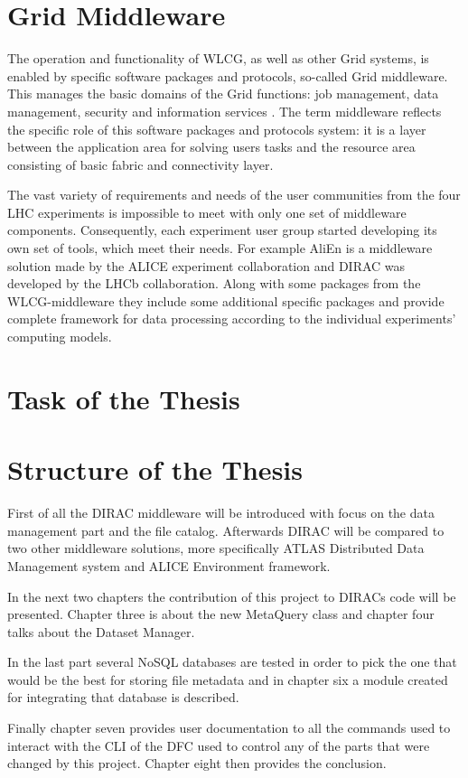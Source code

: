 \section*{Grid Middleware}

The operation and functionality of WLCG, as well as other Grid systems, is enabled by specific software packages and 
protocols, so-called Grid middleware. This manages the basic domains of the Grid functions: job management, data 
management, security and information services \cite{GriCom}. The term middleware reflects the specific role of this 
software packages and protocols system: it is a layer between the application area for solving users tasks and the 
resource area consisting of basic fabric and connectivity layer. 

The vast variety of requirements and needs of the user communities from the four LHC experiments is impossible to 
meet with only one set of middleware components. Consequently, each experiment user group started developing its own 
set of tools, which meet their needs. For example AliEn is a middleware solution made by the ALICE experiment 
collaboration and DIRAC was developed by the LHCb collaboration. Along with some packages from the WLCG-middleware 
they include some additional specific packages and provide complete framework for data processing according to the 
individual experiments' computing models.

\section*{Task of the Thesis}



\section*{Structure of the Thesis}

First of all the DIRAC middleware will be introduced with focus on the data management part and the file
catalog. Afterwards DIRAC will be compared to two other middleware solutions, more specifically ATLAS Distributed 
Data Management system and ALICE Environment framework.

In the next two chapters the contribution of this project to DIRACs code will be presented. Chapter three is about
the new MetaQuery class and chapter four talks about the Dataset Manager.

In the last part several NoSQL databases are tested in order to pick the one that would be the best for storing
file metadata and in chapter six a module created for integrating that database is described. 

Finally chapter seven provides user documentation to all the commands used to interact with the CLI of the DFC
used to control any of the parts that were changed by this project. Chapter eight then provides the conclusion.
